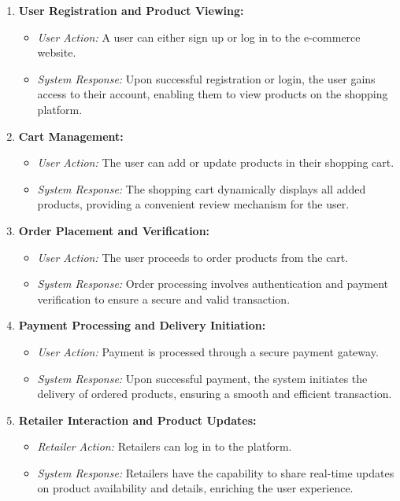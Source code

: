 \documentclass[a4paper,12pt]{article}
\begin{document}
\begin{enumerate}

\item \textbf{User Registration and Product Viewing:}
   \begin{itemize}
      \item \textit{User Action:} A user can either sign up or log in to the e-commerce website.
      \item \textit{System Response:} Upon successful registration or login, the user gains access to their account, enabling them to view products on the shopping platform.
   \end{itemize}

\item \textbf{Cart Management:}
   \begin{itemize}
      \item \textit{User Action:} The user can add or update products in their shopping cart.
      \item \textit{System Response:} The shopping cart dynamically displays all added products, providing a convenient review mechanism for the user.
   \end{itemize}

\item \textbf{Order Placement and Verification:}
   \begin{itemize}
      \item \textit{User Action:} The user proceeds to order products from the cart.
      \item \textit{System Response:} Order processing involves authentication and payment verification to ensure a secure and valid transaction.
   \end{itemize}

\item \textbf{Payment Processing and Delivery Initiation:}
   \begin{itemize}
      \item \textit{User Action:} Payment is processed through a secure payment gateway.
      \item \textit{System Response:} Upon successful payment, the system initiates the delivery of ordered products, ensuring a smooth and efficient transaction.
   \end{itemize}

\item \textbf{Retailer Interaction and Product Updates:}
   \begin{itemize}
      \item \textit{Retailer Action:} Retailers can log in to the platform.
      \item \textit{System Response:} Retailers have the capability to share real-time updates on product availability and details, enriching the user experience.
   \end{itemize}


\end{enumerate}
\end{document}
